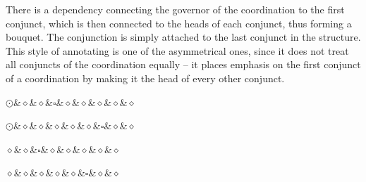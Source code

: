 There is a dependency connecting the governor of the coordination to the first conjunct, which is then connected to the heads of each conjunct, thus forming a bouquet. The conjunction is simply attached to the last conjunct in the structure. This style of annotating is one of the asymmetrical ones, since it does not treat all conjuncts of the coordination equally -- it places emphasis on the first conjunct of a coordination by making it the head of every other conjunct. 
\begin{multicols}{2}
\begin{exe}
\ex
\label{ex:bouquet diagrams}
\begin{xlist}
\ex
\begin{dependency}[theme = simple]
    \begin{deptext}
        $\odot$\&$\diamond$\&$\diamond$\&$\square$\&$\diamond$\&$\diamond$\&$\diamond$\&$\diamond$\&$\diamond$\\
    \end{deptext}
\end{dependency}

\ex
\begin{dependency}[theme = simple]
    \begin{deptext}
        $\odot$\&$\diamond$\&$\diamond$\&$\diamond$\&$\diamond$\&$\diamond$\&$\square$\&$\diamond$\&$\diamond$\\
    \end{deptext}
\end{dependency}

\ex
\begin{dependency}[theme = simple]
    \begin{deptext}
        $\diamond$\&$\diamond$\&$\square$\&$\diamond$\&$\diamond$\&$\diamond$\&$\diamond$\&$\diamond$\\
    \end{deptext}
\end{dependency}

\ex
\begin{dependency}[theme = simple]
    \begin{deptext}
        $\diamond$\&$\diamond$\&$\diamond$\&$\diamond$\&$\diamond$\&$\square$\&$\diamond$\&$\diamond$\\
    \end{deptext}
\end{dependency}


\end{xlist}
\end{exe}
\end{multicols}
